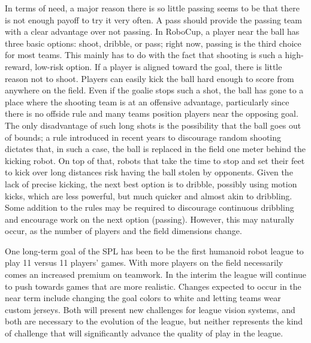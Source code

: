 \documentclass{llncs}
\begin{document}
In terms of need, a major reason there is so little passing seems to be that there is not enough payoff
to try it very often. A pass should provide the passing team with a clear advantage over
not passing. In RoboCup, a player near the ball has three basic options: shoot, dribble,
or pass; right now, passing is the third choice for most teams. This mainly has
to do with the fact that shooting is such a high-reward, low-risk option.
If a player is aligned toward the goal, there is little reason not to shoot. Players
can easily kick the ball hard enough to score from anywhere on the field. Even if the
goalie stops such a shot, the ball has gone to a place where the shooting team is at an
offensive advantage, particularly since there is no offside rule and many teams
position players near the opposing goal. The only disadvantage of such long shots is
the possibility that the ball goes out of bounds; a rule introduced in recent years to discourage random shooting dictates that, in such a case, the ball is replaced in the field one meter behind the kicking robot. On top of that, robots that take the time to stop and set their feet to kick over long distances risk having the
ball stolen by opponents. Given the lack of precise kicking, the next best option is to dribble, possibly using motion kicks, which are less powerful, but much quicker and almost akin to dribbling. 
Some addition to the rules may be required to discourage continuous dribbling and encourage work on the next option (passing). However, this may naturally occur, as the number of players and the field dimensions change. 

One long-term goal
of the SPL has been to be the first humanoid robot league to play 11 versus 11 players' games.
With more players on the field necessarily comes an increased premium on teamwork.
In the interim the league will continue to push towards games that are more realistic.
Changes expected to occur in the near term include changing the goal colors to white
and letting teams wear custom jerseys. Both will present new challenges for league vision
systems, and both are necessary to the evolution of the league, but neither represents the
kind of challenge that will significantly advance the quality of play in the league. 
\end{document}
